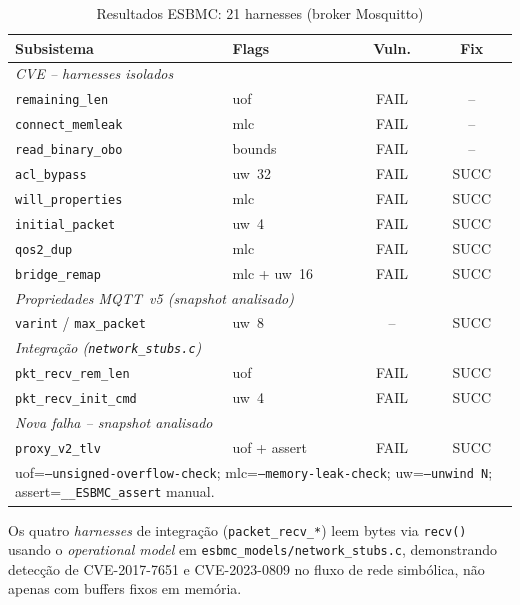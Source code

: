 \documentclass[conference]{IEEEtran}
\begin{document}
\begin{table}[htbp]
\caption{Resultados ESBMC: 21 harnesses (broker Mosquitto)}
\label{tab:results}
\centering
\scriptsize
\setlength{\tabcolsep}{3pt}
\begin{tabular}{p{2.6cm}p{2.0cm}cc}
\hline
Subsistema & Flags & Vuln. & Fix \\
\hline
\multicolumn{4}{l}{\textit{CVE -- harnesses isolados}} \\[0.2ex]
\texttt{remaining\_len}    & uof           & FAIL & -- \\
\texttt{connect\_memleak}  & mlc           & FAIL & -- \\
\texttt{read\_binary\_obo} & bounds        & FAIL & -- \\
\texttt{acl\_bypass}       & uw~32         & FAIL & SUCC \\
\texttt{will\_properties}  & mlc           & FAIL & SUCC \\
\texttt{initial\_packet}   & uw~4          & FAIL & SUCC \\
\texttt{qos2\_dup}         & mlc           & FAIL & SUCC \\
\texttt{bridge\_remap}     & mlc + uw~16   & FAIL & SUCC \\
\hline
\multicolumn{4}{l}{\textit{Propriedades MQTT~v5 (snapshot analisado)}} \\[0.2ex]
\texttt{varint} / \texttt{max\_packet} & uw~8 & -- & SUCC \\
\hline
\multicolumn{4}{l}{\textit{Integra\c{c}\~ao (\texttt{network\_stubs.c})}} \\[0.2ex]
\texttt{pkt\_recv\_rem\_len} & uof          & FAIL & SUCC \\
\texttt{pkt\_recv\_init\_cmd} & uw~4        & FAIL & SUCC \\
\hline
\multicolumn{4}{l}{\textit{Nova falha -- snapshot analisado}} \\[0.2ex]
\texttt{proxy\_v2\_tlv}    & uof + assert  & FAIL & SUCC \\
\hline
\multicolumn{4}{p{8.5cm}}{\footnotesize
uof=\texttt{--unsigned-overflow-check}; mlc=\texttt{--memory-leak-check};
uw=\texttt{--unwind~N}; assert=\texttt{\_\_ESBMC\_assert} manual.} \\
\end{tabular}
\end{table}

Os quatro \emph{harnesses} de integra\c{c}\~ao (\texttt{packet\_recv\_*}) leem bytes via \texttt{recv()} usando o \emph{operational model} em \texttt{esbmc\_models/network\_stubs.c}, demonstrando detec\c{c}\~ao de CVE-2017-7651 e CVE-2023-0809 no fluxo de rede simb\'olica, n\~ao apenas com buffers fixos em mem\'oria.
\end{document}
